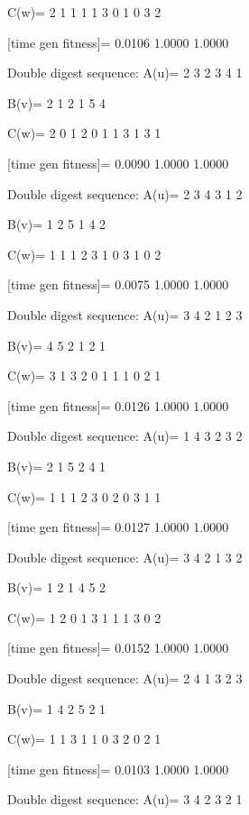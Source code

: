 C(w)=
     2     1     1     1     1     3     0     1     0     3     2

[time gen fitness]=
    0.0106    1.0000    1.0000

Double digest sequence:
A(u)=
     2     3     2     3     4     1

B(v)=
     2     1     2     1     5     4

C(w)=
     2     0     1     2     0     1     1     3     1     3     1

[time gen fitness]=
    0.0090    1.0000    1.0000

Double digest sequence:
A(u)=
     2     3     4     3     1     2

B(v)=
     1     2     5     1     4     2

C(w)=
     1     1     1     2     3     1     0     3     1     0     2

[time gen fitness]=
    0.0075    1.0000    1.0000

Double digest sequence:
A(u)=
     3     4     2     1     2     3

B(v)=
     4     5     2     1     2     1

C(w)=
     3     1     3     2     0     1     1     1     0     2     1

[time gen fitness]=
    0.0126    1.0000    1.0000

Double digest sequence:
A(u)=
     1     4     3     2     3     2

B(v)=
     2     1     5     2     4     1

C(w)=
     1     1     1     2     3     0     2     0     3     1     1

[time gen fitness]=
    0.0127    1.0000    1.0000

Double digest sequence:
A(u)=
     3     4     2     1     3     2

B(v)=
     1     2     1     4     5     2

C(w)=
     1     2     0     1     3     1     1     1     3     0     2

[time gen fitness]=
    0.0152    1.0000    1.0000

Double digest sequence:
A(u)=
     2     4     1     3     2     3

B(v)=
     1     4     2     5     2     1

C(w)=
     1     1     3     1     1     0     3     2     0     2     1

[time gen fitness]=
    0.0103    1.0000    1.0000

Double digest sequence:
A(u)=
     3     4     2     3     2     1

